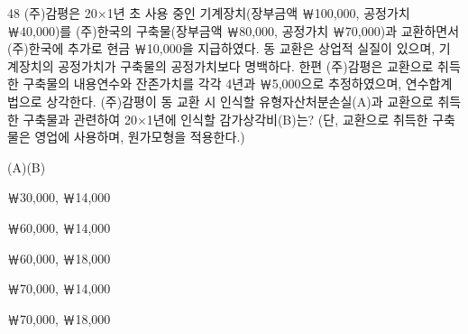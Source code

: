 \begin{question}{48}
(주)감평은 20×1년 초 사용 중인 기계장치(장부금액 ￦100,000, 공정가치 ￦40,000)를 (주)한국의 구축물(장부금액 ￦80,000, 공정가치 ￦70,000)과 교환하면서 (주)한국에 추가로 현금 ￦10,000을 지급하였다. 동 교환은 상업적 실질이 있으며, 기계장치의 공정가치가 구축물의 공정가치보다 명백하다. 한편 (주)감평은 교환으로 취득한 구축물의 내용연수와 잔존가치를 각각 4년과 ￦5,000으로 추정하였으며, 연수합계법으로 상각한다. (주)감평이 동 교환 시 인식할 유형자산처분손실(A)과 교환으로 취득한 구축물과 관련하여 20×1년에 인식할 감가상각비(B)는? (단, 교환으로 취득한 구축물은 영업에 사용하며, 원가모형을 적용한다.)
\par\noindent\hspace{3em}(A)\hspace{3.2em}(B)
\begin{choices}
  \item ￦30,000, ￦14,000
  \item ￦60,000, ￦14,000
  \item ￦60,000, ￦18,000
  \item ￦70,000, ￦14,000
  \item ￦70,000, ￦18,000
\end{choices}
\end{question}
